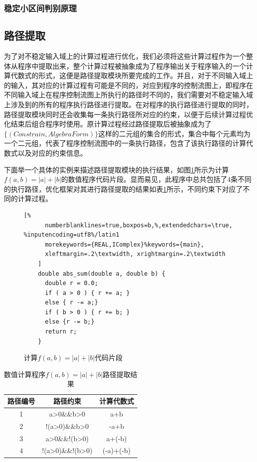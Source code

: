 \subsubsection{稳定小区间判别原理}


\subsection{路径提取}
为了对不稳定输入域上的计算过程进行优化，我们必须将这些计算过程作为一个整体从程序中提取出来，整个计算过程被抽象成为了程序输出关于程序输入的一个计算代数式的形式，这便是路径提取模块所要完成的工作。并且，对于不同输入域上的输入，其对应的计算过程有可能是不同的，对应到程序的控制流图上，即程序在不同输入域上在程序控制流图上所执行的路径时不同的，我们需要对不稳定输入域上涉及到的所有的程序执行路径进行提取。在对程序的执行路径进行提取的同时，路径提取模块同时还会收集每一条执行路径所对应的约束，以便于后续计算过程优化结束后组合程序时使用。原计算过程经过路径提取后被抽象成为了$\{(Constrain, AlgebraForm)\}$这样的二元组的集合的形式，集合中每个元素均为一个二元组，代表了程序控制流图中的一条执行路径，包含了该执行路径的计算代数式以及对应的约束信息。

下面举一个具体的实例来描述路径提取模块的执行结果，如图\ref{lst:symextexam}所示为计算$f(a,b)=|a|+|b|$的数值程序代码片段。显而易见，此程序中总共包括了4条不同的执行路径，优化框架对其进行路径提取的结果如表\ref{tbl:abssumres}所示，不同约束下对应了不同的计算过程。

\begin{figure}[thbp]
    \begin{lstlisting}[%
      numberblanklines=true,boxpos=b,%,extendedchars=\true, %inputencoding=utf8%/latin1
      morekeywords={REAL,IComplex}%keywords={main},
      xleftmargin=.2\textwidth, xrightmargin=.2\textwidth
    ]
    double abs_sum(double a, double b) {
      double r = 0.0;
      if ( a > 0 ) { r += a; } 
      else { r -= a;}
      if ( b > 0 ) { r += b; }
      else {r -= b;}
      return r;
    }
    \end{lstlisting}
    \caption{计算$f(a,b)=|a|+|b|$代码片段}
    \label{lst:symextexam}
\end{figure}

\begin{table}
  \centering
  \begin{tabular}{ccc}
    \toprule
    \textbf{路径编号} & \textbf{路径约束} & \textbf{计算代数式} \\
    \midrule
    1 & a>0\&\&b>0 & a+b \\
    2 & !(a>0)\&\&b>0 & -a+b \\
    3 & a>0\&\&!(b>0) & a+(-b) \\
    4 & !(a>0)\&\&!(b>0) & (-a)+(-b) \\
    \bottomrule
  \end{tabular}
  \caption{数值计算程序$f(a,b)=|a|+|b|$路径提取结果}\label{tbl:abssumres}
\end{table}

